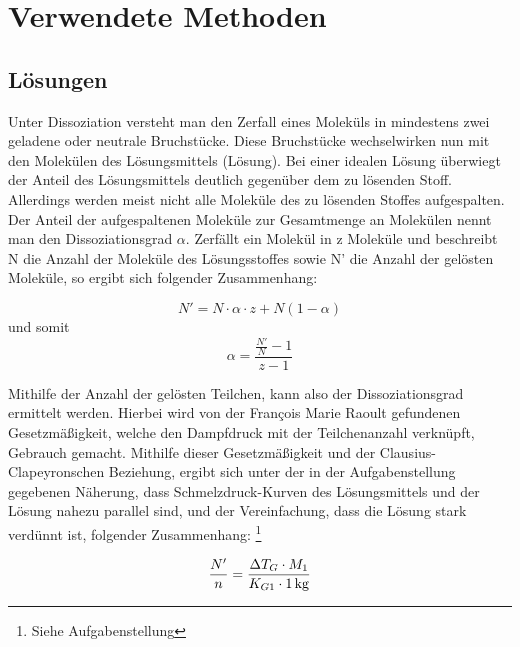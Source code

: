 \section{Verwendete Methoden}
\subsection{Lösungen}
Unter Dissoziation versteht man den Zerfall eines Moleküls in mindestens zwei geladene oder neutrale Bruchstücke. Diese Bruchstücke wechselwirken nun mit den Molekülen des Lösungsmittels (Lösung). Bei einer idealen Lösung überwiegt der Anteil des Lösungsmittels deutlich gegenüber dem zu lösenden Stoff. Allerdings werden meist nicht alle Moleküle des zu lösenden Stoffes aufgespalten. Der Anteil der aufgespaltenen Moleküle zur Gesamtmenge an Molekülen nennt man den Dissoziationsgrad $\alpha$. Zerfällt ein Molekül in z Moleküle und beschreibt N die Anzahl der Moleküle des Lösungsstoffes sowie N' die Anzahl der gelösten Moleküle, so ergibt sich folgender Zusammenhang:

\begin{equation}
N' = N \cdot \alpha \cdot z + N(1-\alpha)
\end{equation}
und somit
\begin{equation}
\alpha = \frac{\frac{N'}{N}-1}{z-1} \label{eq:alpha}
\end{equation}

Mithilfe der Anzahl der gelösten Teilchen, kann also der Dissoziationsgrad ermittelt werden. Hierbei wird von der  François Marie Raoult gefundenen Gesetzmäßigkeit, welche den Dampfdruck mit der Teilchenanzahl verknüpft, Gebrauch gemacht. Mithilfe dieser Gesetzmäßigkeit und der Clausius-Clapeyronschen Beziehung, ergibt sich unter der in der Aufgabenstellung gegebenen Näherung, dass Schmelzdruck-Kurven des Lösungsmittels und der Lösung nahezu parallel sind, und der Vereinfachung, dass die Lösung stark verdünnt ist, folgender Zusammenhang: \footnote{Siehe Aufgabenstellung}

\begin{equation}
\frac{N'}{n} = \frac{\Delta T_G \cdot M_1}{K_{G1} \cdot \unit[1]{kg}} \label{eq:N'}
\end{equation}

